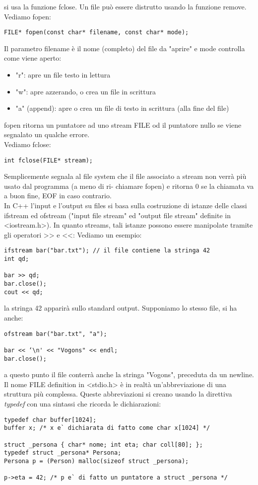 \documentclass[a4paper,12pt, oneside]{book}
\begin{document}
si usa la funzione fclose. Un file può essere distrutto usando la funzione remove. \\
Vediamo fopen:
\begin{verbatim}
FILE* fopen(const char* filename, const char* mode);
\end{verbatim}
Il parametro filename è il nome (completo) del file da "aprire" e mode controlla come viene aperto:
\begin{itemize}
\item "r": apre un file testo in lettura
\item "w": apre azzerando, o crea un file in scrittura
\item "a" (append): apre o crea un file di testo in scrittura (alla fine del file)
\end{itemize}
fopen ritorna un puntatore ad uno stream FILE od il puntatore
nullo se viene segnalato un qualche errore.
\\
Vediamo fclose:
\begin{verbatim}
int fclose(FILE* stream);
\end{verbatim}
Semplicemente segnala al file system che il file associato a
stream non verrà più usato dal programma (a meno di ri-
chiamare fopen) e ritorna 0 se la chiamata va a buon fine, EOF in caso contrario.\\
In C++ l'input e l'output su files si basa sulla costruzione di istanze delle classi ifstream ed ofstream ("input file stream" ed "output file stream" definite in <iostream.h>). In quanto streams, tali istanze possono essere manipolate
tramite gli operatori >> e <<: Vediamo un esempio:
\begin{verbatim}
ifstream bar("bar.txt"); // il file contiene la stringa 42
int qd;

bar >> qd;
bar.close();
cout << qd;
\end{verbatim}
la stringa 42 apparirà sullo standard output. Supponiamo lo stesso file, si ha anche:
\begin{verbatim}
ofstream bar("bar.txt", "a");

bar << ‘\n' << "Vogons" << endl;
bar.close();
\end{verbatim}
a questo punto il file conterrà anche la stringa "Vogons",
preceduta da un newline.\\
Il nome FILE definition in <stdio.h> è in realtà un'abbreviazione di una struttura più complessa.  Queste abbreviazioni si creano usando la direttiva \textit{typedef }con una
sintassi che ricorda le dichiarazioni:
\begin{verbatim}
typedef char buffer[1024];
buffer x; /* x e` dichiarata di fatto come char x[1024] */ 

struct _persona { char* nome; int eta; char coll[80]; };
typedef struct _persona* Persona;
Persona p = (Person) malloc(sizeof struct _persona); 

p->eta = 42; /* p e` di fatto un puntatore a struct _persona */
\end{verbatim}
\end{document}
